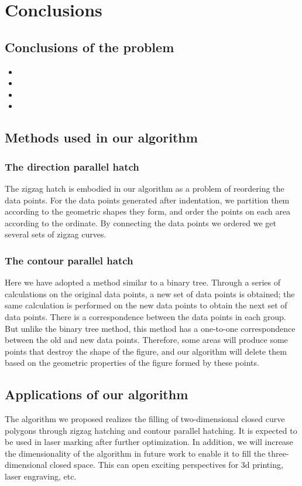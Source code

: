 \documentclass{apmcmthesis}
\begin{document}
\section{Conclusions}

\subsection{Conclusions of the problem}
\begin{itemize}
  \item
  \item
  \item
  \item
\end{itemize}
\subsection{Methods used in our algorithm}
\subsubsection{The direction parallel hatch}
The zigzag hatch is embodied in our algorithm as a problem of reordering the data points. For the data points generated after indentation, we partition them according to the geometric shapes they form, and order the points on each area according to the ordinate. By connecting the data points we ordered we get several sets of zigzag curves.
\subsubsection{The contour parallel hatch}
Here we have adopted a method similar to a binary tree. Through a series of calculations on the original data points, a new set of data points is obtained; the same calculation is performed on the new data points to obtain the next set of data points. There is a correspondence between the data points in each group. But unlike the binary tree method, this method has a one-to-one correspondence between the old and new data points. Therefore, some areas will produce some points that destroy the shape of the figure, and our algorithm will delete them based on the geometric properties of the figure formed by these points.
\subsection{Applications of our algorithm}
The algorithm we proposed realizes the filling of two-dimensional closed curve polygons through zigzag hatching and contour parallel hatching. It is expected to be used in laser marking after further optimization. In addition, we will increase the dimensionality of the algorithm in future work to enable it to fill the three-dimensional closed space. This can open exciting perspectives for 3d printing, laser engraving, etc.
\end{document}
